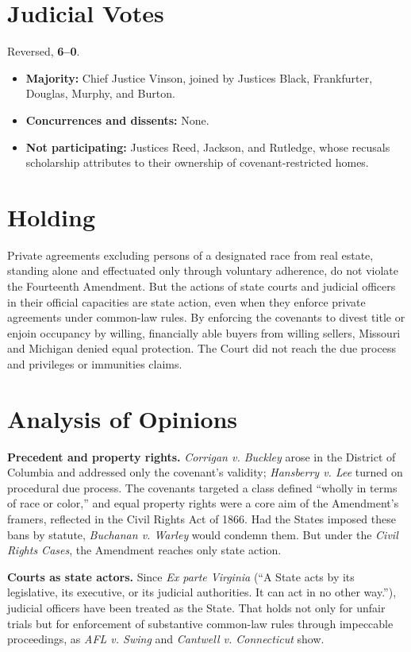 \documentclass[12pt]{article}
\begin{document}
\section{Judicial Votes}

Reversed, \textbf{6--0}.
\begin{itemize}
\item \textbf{Majority:} Chief Justice Vinson, joined by Justices Black, Frankfurter, Douglas, Murphy, and Burton.
\item \textbf{Concurrences and dissents:} None.
\item \textbf{Not participating:} Justices Reed, Jackson, and Rutledge, whose recusals scholarship attributes to their ownership of covenant-restricted homes.
\end{itemize}

\section{Holding}

Private agreements excluding persons of a designated race from real estate, standing alone and effectuated only through voluntary adherence, do not violate the Fourteenth Amendment. But the actions of state courts and judicial officers in their official capacities are state action, even when they enforce private agreements under common-law rules. By enforcing the covenants to divest title or enjoin occupancy by willing, financially able buyers from willing sellers, Missouri and Michigan denied equal protection. The Court did not reach the due process and privileges or immunities claims.

\section{Analysis of Opinions}

\textbf{Precedent and property rights.} \textit{Corrigan v. Buckley} arose in the District of Columbia and addressed only the covenant's validity; \textit{Hansberry v. Lee} turned on procedural due process. The covenants targeted a class defined ``wholly in terms of race or color,'' and equal property rights were a core aim of the Amendment's framers, reflected in the Civil Rights Act of 1866. Had the States imposed these bans by statute, \textit{Buchanan v. Warley} would condemn them. But under the \textit{Civil Rights Cases}, the Amendment reaches only state action.

\textbf{Courts as state actors.} Since \textit{Ex parte Virginia} (``A State acts by its legislative, its executive, or its judicial authorities. It can act in no other way.''), judicial officers have been treated as the State. That holds not only for unfair trials but for enforcement of substantive common-law rules through impeccable proceedings, as \textit{AFL v. Swing} and \textit{Cantwell v. Connecticut} show.
\end{document}
